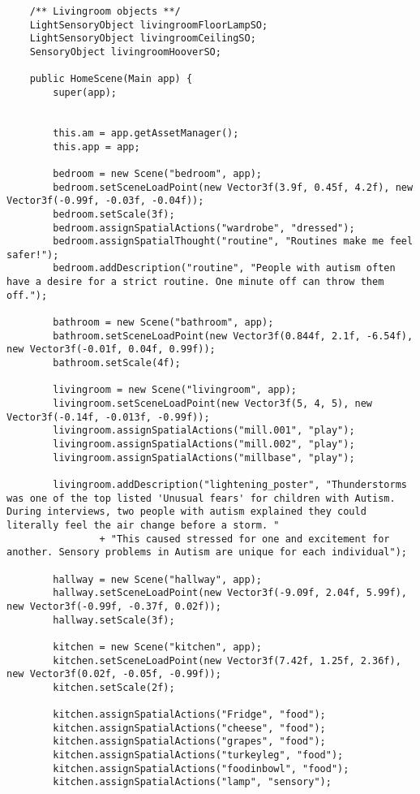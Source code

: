 \begin{lstlisting}
    /** Livingroom objects **/
    LightSensoryObject livingroomFloorLampSO;
    LightSensoryObject livingroomCeilingSO;
    SensoryObject livingroomHooverSO;
    
    public HomeScene(Main app) {
        super(app);
        
        
        this.am = app.getAssetManager();
        this.app = app; 
        
        bedroom = new Scene("bedroom", app);
        bedroom.setSceneLoadPoint(new Vector3f(3.9f, 0.45f, 4.2f), new Vector3f(-0.99f, -0.03f, -0.04f));
        bedroom.setScale(3f);
        bedroom.assignSpatialActions("wardrobe", "dressed");
        bedroom.assignSpatialThought("routine", "Routines make me feel safer!");
        bedroom.addDescription("routine", "People with autism often have a desire for a strict routine. One minute off can throw them off.");
               
        bathroom = new Scene("bathroom", app);
        bathroom.setSceneLoadPoint(new Vector3f(0.844f, 2.1f, -6.54f), new Vector3f(-0.01f, 0.04f, 0.99f));
        bathroom.setScale(4f);
        
        livingroom = new Scene("livingroom", app);
        livingroom.setSceneLoadPoint(new Vector3f(5, 4, 5), new Vector3f(-0.14f, -0.013f, -0.99f));
        livingroom.assignSpatialActions("mill.001", "play");
        livingroom.assignSpatialActions("mill.002", "play");
        livingroom.assignSpatialActions("millbase", "play");
        
        livingroom.addDescription("lightening_poster", "Thunderstorms was one of the top listed 'Unusual fears' for children with Autism. During interviews, two people with autism explained they could literally feel the air change before a storm. "
                + "This caused stressed for one and excitement for another. Sensory problems in Autism are unique for each individual"); 
        
        hallway = new Scene("hallway", app);
        hallway.setSceneLoadPoint(new Vector3f(-9.09f, 2.04f, 5.99f), new Vector3f(-0.99f, -0.37f, 0.02f));
        hallway.setScale(3f);
        
        kitchen = new Scene("kitchen", app);
        kitchen.setSceneLoadPoint(new Vector3f(7.42f, 1.25f, 2.36f), new Vector3f(0.02f, -0.05f, -0.99f));
        kitchen.setScale(2f);
        
        kitchen.assignSpatialActions("Fridge", "food");
        kitchen.assignSpatialActions("cheese", "food");
        kitchen.assignSpatialActions("grapes", "food");
        kitchen.assignSpatialActions("turkeyleg", "food");
        kitchen.assignSpatialActions("foodinbowl", "food");
        kitchen.assignSpatialActions("lamp", "sensory");
        

\end{lstlisting}
